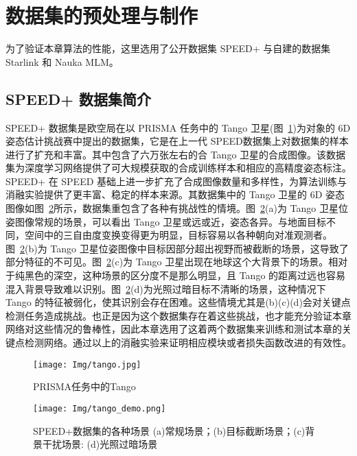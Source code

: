 \section{数据集的预处理与制作}
为了验证本章算法的性能，这里选用了公开数据集 SPEED+ 与自建的数据集 Starlink 和 Nauka MLM。

\subsection{SPEED+ 数据集简介}
SPEED+ 数据集\cite{speed+}是欧空局在以 PRISMA 任务中的 Tango 卫星(图~\ref{fig:tango})为对象的 6D 姿态估计挑战赛中提出的数据集，它是在上一代 SPEED\cite{SPEED-Dataset}数据集上对数据集的样本进行了扩充和丰富。其中包含了六万张左右的合 Tango 卫星的合成图像。该数据集为深度学习网络提供了可大规模获取的合成训练样本和相应的高精度姿态标注。SPEED+ 在 SPEED 基础上进一步扩充了合成图像数量和多样性，为算法训练与消融实验提供了更丰富、稳定的样本来源。其数据集中的 Tango 卫星的 6D 姿态图像如图~\ref{fig:tango_demo}所示，数据集重包含了各种有挑战性的情境。图~\ref{fig:tango_demo}(a)为 Tango 卫星位姿图像常规的场景，可以看出 Tango 卫星或远或近，姿态各异。与地面目标不同，空间中的三自由度变换变得更为明显，目标容易以各种朝向对准观测者。图~\ref{fig:tango_demo}(b)为 Tango 卫星位姿图像中目标因部分超出视野而被截断的场景，这导致了部分特征的不可见。图~\ref{fig:tango_demo}(c)为 Tango 卫星出现在地球这个大背景下的场景。相对于纯黑色的深空，这种场景的区分度不是那么明显，且 Tango 的距离过远也容易混入背景导致难以识别。图~\ref{fig:tango_demo}(d)为光照过暗目标不清晰的场景，这种情况下 Tango 的特征被弱化，使其识别会存在困难。这些情境尤其是(b)(c)(d)会对关键点检测任务造成挑战。也正是因为这个数据集存在着这些挑战，也才能充分验证本章网络对这些情况的鲁棒性，因此本章选用了这着两个数据集来训练和测试本章的关键点检测网络。通过以上的消融实验来证明相应模块或者损失函数改进的有效性。

\begin{figure}[htbp]
	\centering
	\texttt{[image: Img/tango.jpg]}
	\caption{PRISMA任务中的Tango}
	\label{fig:tango}
	\vspace{-12pt}
\end{figure}

\begin{figure}[htbp]
	\centering
	\texttt{[image: Img/tango\_demo.png]}
	\caption{SPEED+数据集的各种场景 (a)常规场景；(b)目标截断场景；(c)背景干扰场景: (d)光照过暗场景}
	\label{fig:tango_demo}
	\vspace{-3pt}
\end{figure}

